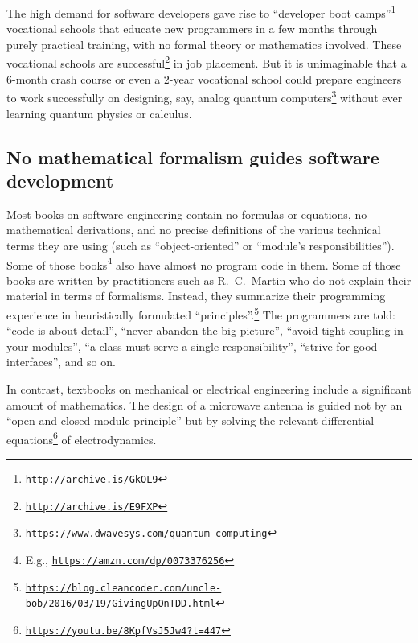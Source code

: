 The high demand for software developers gave rise to \textsf{``}developer
boot camps\textsf{''}\footnote{\texttt{\href{http://archive.is/GkOL9}{http://archive.is/GkOL9}}}
\textemdash{} vocational schools that educate new programmers in a
few months through purely practical training, with no formal theory
or mathematics involved. These vocational schools are successful\footnote{\texttt{\href{http://archive.is/E9FXP}{http://archive.is/E9FXP}}}
in job placement. But it is unimaginable that a $6$-month crash course
or even a $2$-year vocational school could prepare engineers to work
successfully on designing, say, analog quantum computers\footnote{\texttt{\href{https://www.dwavesys.com/quantum-computing}{https://www.dwavesys.com/quantum-computing}}}
without ever learning quantum physics or calculus.

\subsection*{No mathematical formalism guides software development}

Most books on software engineering contain no formulas or equations,
no mathematical derivations, and no precise definitions of the various
technical terms they are using (such as \textsf{``}object-oriented\textsf{''} or \textsf{``}module\textsf{'}s
responsibilities\textsf{''}). Some of those books\footnote{E.g., \texttt{\href{https://amzn.com/dp/0073376256}{https://amzn.com/dp/0073376256}}}
also have almost no program code in them. Some of those books are
written by practitioners such as R.\ C.\ Martin who do not explain
their material in terms of formalisms. Instead, they summarize their
programming experience in heuristically formulated \textquotedblleft principles\textquotedblright .\footnote{\texttt{\href{https://blog.cleancoder.com/uncle-bob/2016/03/19/GivingUpOnTDD.html}{https://blog.cleancoder.com/uncle-bob/2016/03/19/GivingUpOnTDD.html}}}
The programmers are told: \textsf{``}code is about detail\textsf{''}, \textsf{``}never abandon
the big picture\textsf{''}, \textsf{``}avoid tight coupling in your modules\textsf{''}, \textsf{``}a
class must serve a single responsibility\textsf{''}, \textsf{``}strive for good interfaces\textsf{''},
and so on. 

In contrast, textbooks on mechanical or electrical engineering include
a significant amount of mathematics. The design of a microwave antenna
is guided not by an \textsf{``}open and closed module principle\textsf{''} but by
solving the relevant differential equations\footnote{\texttt{\href{https://youtu.be/8KpfVsJ5Jw4?t=447}{https://youtu.be/8KpfVsJ5Jw4?t=447}}}
of electrodynamics.

